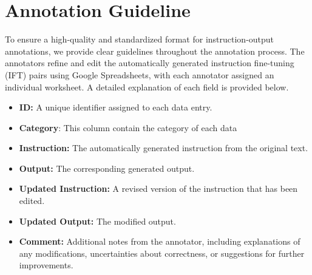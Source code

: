 \section{Annotation Guideline}
\label{app:annot-guide-appendix}
To ensure a high-quality and standardized format for instruction-output annotations, we provide clear guidelines throughout the annotation process. The annotators refine and edit the automatically generated instruction fine-tuning (IFT) pairs using Google Spreadsheets, with each annotator assigned an individual worksheet. A detailed explanation of each field is provided below.
\\
\begin{itemize}
    \item \textbf{ID:} A unique identifier assigned to each data entry.

\item \textbf{Category}: This column contain the category of each data 
\item \textbf{Instruction:} The automatically generated instruction from the original text.
    \item \textbf{Output:} The corresponding generated output.
    \item \textbf{Updated Instruction:} A revised version of the instruction that has been edited.
    \item \textbf{Updated Output:} The modified output.
    \item \textbf{Comment:} Additional notes from the annotator, including explanations of any modifications, uncertainties about correctness, or suggestions for further improvements.

\end{itemize}


